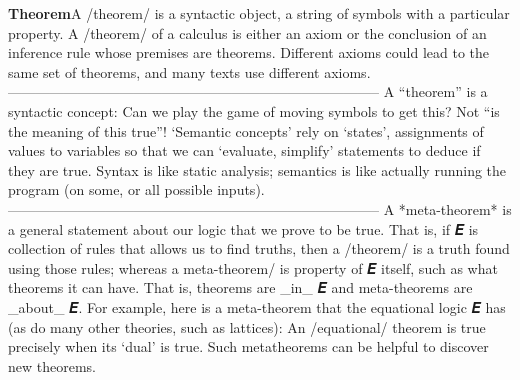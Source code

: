 \documentclass[11pt]{article}
\begin{document}
\vspace{1em}\textbf{Theorem}\quad\label{org-special-block-extras-glossary-Theorem}A /theorem/ is a syntactic object, a string of symbols with a particular property.  A /theorem/ of a calculus is either an axiom or the conclusion of an inference rule whose premises are theorems.  Different axioms could lead to the same set of theorems, and many texts use different axioms.  --------------------------------------------------------------------------------  A “theorem” is a syntactic concept: Can we play the game of moving symbols to get this? Not “is the meaning of this true”! \quad ‘Semantic concepts’ rely on ‘states’, assignments of values to variables so that we can ‘evaluate, simplify’ statements to deduce if they are true.  Syntax is like static analysis; semantics is like actually running the program (on some, or all possible inputs).  --------------------------------------------------------------------------------  A *meta-theorem* is a general statement about our logic that we prove to be true. That is, if 𝑬 is collection of rules that allows us to find truths, then a /theorem/ is a truth found using those rules; whereas a meta-theorem/ is property of 𝑬 itself, such as what theorems it can have. \quad That is, theorems are _in_ 𝑬 and meta-theorems are _about_ 𝑬. \quad For example, here is a meta-theorem that the equational logic 𝑬 has (as do many other theories, such as lattices): An /equational/ theorem is true precisely when its ‘dual’ is true. Such metatheorems can be helpful to discover new theorems. 
\end{document}

